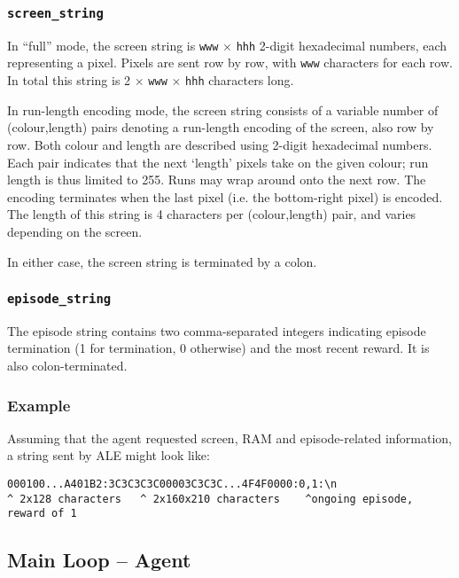 \documentclass[12pt]{article}
\begin{document}
\subsubsection{\texttt{screen\_string}}

In ``full'' mode, the screen string is \texttt{www} $\times$ \texttt{hhh} 2-digit hexadecimal numbers, each representing a pixel. Pixels are sent row by row, with \texttt{www} characters for each row. In total this string is 2 $\times$ \texttt{www} $\times$ \texttt{hhh} characters long.

In run-length encoding mode, the screen string consists of a variable number of (colour,length) pairs denoting a run-length encoding of the screen, also row by row. Both colour and length are described using 2-digit hexadecimal numbers. Each pair indicates that the next `length' pixels take on the given colour; run length is thus limited to 255. Runs may wrap around onto the next row. The encoding terminates when the last pixel (i.e. the bottom-right pixel) is encoded. The length of this string is 4 characters per (colour,length) pair, and varies depending on the screen.

In either case, the screen string is terminated by a colon.

\subsubsection{\texttt{episode\_string}}

The episode string contains two comma-separated integers indicating episode termination (1 for
termination, 0 otherwise) and the most recent reward. It is also colon-terminated.

\subsubsection{Example}

Assuming that the agent requested screen, RAM and episode-related information, a string sent by ALE might look like:

\begin{verbatim}
000100...A401B2:3C3C3C3C00003C3C3C...4F4F0000:0,1:\n
^ 2x128 characters   ^ 2x160x210 characters    ^ongoing episode, reward of 1
\end{verbatim}

\subsection{Main Loop -- Agent}
\end{document}
